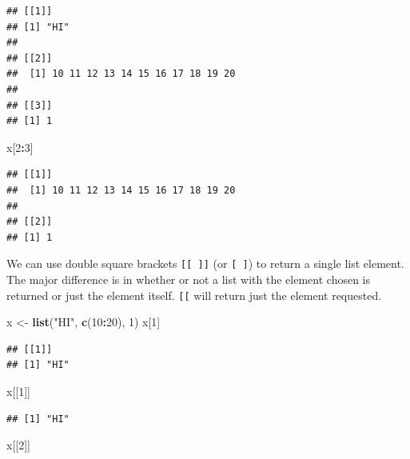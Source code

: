 \documentclass[
]{book}
\newenvironment{Shaded}{\begin{snugshade}}{\end{snugshade}}
\newcommand{\DecValTok}[1]{\textcolor[rgb]{0.00,0.00,0.81}{#1}}
\newcommand{\KeywordTok}[1]{\textcolor[rgb]{0.13,0.29,0.53}{\textbf{#1}}}
\newcommand{\NormalTok}[1]{#1}
\newcommand{\OperatorTok}[1]{\textcolor[rgb]{0.81,0.36,0.00}{\textbf{#1}}}
\newcommand{\StringTok}[1]{\textcolor[rgb]{0.31,0.60,0.02}{#1}}
\theoremstyle{definition}
\theoremstyle{definition}
\theoremstyle{definition}
\theoremstyle{remark}
\begin{document}
\begin{verbatim}
## [[1]]
## [1] "HI"
## 
## [[2]]
##  [1] 10 11 12 13 14 15 16 17 18 19 20
## 
## [[3]]
## [1] 1
\end{verbatim}

\begin{Shaded}
\begin{Highlighting}[]
\NormalTok{x[}\DecValTok{2}\OperatorTok{:}\DecValTok{3}\NormalTok{]}
\end{Highlighting}
\end{Shaded}

\begin{verbatim}
## [[1]]
##  [1] 10 11 12 13 14 15 16 17 18 19 20
## 
## [[2]]
## [1] 1
\end{verbatim}

We can use double square brackets \texttt{{[}{[}\ {]}{]}} (or \texttt{{[}\ {]}}) to return a single list element. The major difference is in whether or not a list with the element chosen is returned or just the element itself. \texttt{{[}{[}} will return just the element requested.

\begin{Shaded}
\begin{Highlighting}[]
\NormalTok{x <-}\StringTok{ }\KeywordTok{list}\NormalTok{(}\StringTok{"HI"}\NormalTok{, }\KeywordTok{c}\NormalTok{(}\DecValTok{10}\OperatorTok{:}\DecValTok{20}\NormalTok{), }\DecValTok{1}\NormalTok{)}
\NormalTok{x[}\DecValTok{1}\NormalTok{]}
\end{Highlighting}
\end{Shaded}

\begin{verbatim}
## [[1]]
## [1] "HI"
\end{verbatim}

\begin{Shaded}
\begin{Highlighting}[]
\NormalTok{x[[}\DecValTok{1}\NormalTok{]]}
\end{Highlighting}
\end{Shaded}

\begin{verbatim}
## [1] "HI"
\end{verbatim}

\begin{Shaded}
\begin{Highlighting}[]
\NormalTok{x[[}\DecValTok{2}\NormalTok{]]}
\end{Highlighting}
\end{Shaded}
\end{document}
